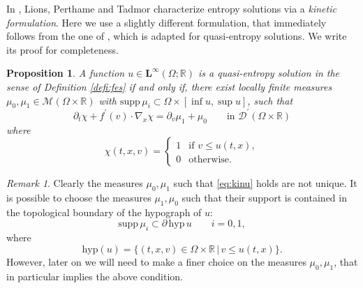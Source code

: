 \documentclass[11pt, twoside, reqno]{amsart}
\newtheorem{prop}[thm]{Proposition}
\theoremstyle{definition}
\theoremstyle{remark}
\newtheorem{remark}[thm]{Remark}
\numberwithin{equation}{section}
\newcommand{\R}{\mathbb R}
\newcommand{\mr}[1]{\mathrm{#1}}
\newcommand{\msc}[1]{\mathscr{#1}}
\begin{document}
 In \cite{LPT_kinetic}, Lions, Perthame and Tadmor characterize entropy solutions via a \textit{kinetic formulation}. 
Here we use a slightly different formulation, that immediately follows from the one of \cite{DOW03}, which is adapted for quasi-entropy solutions. We write its proof for completeness.
\begin{prop}\label{prop:feskin}
    A function $u \in \mathbf L^\infty(\Omega; \mathbb R)$ is a quasi-entropy solution in the sense of Definition \ref{defi:fes} if and only if, 
there exist locally finite measures $\mu_0, \mu_1 \in \msc M(\Omega \times \mathbb R)$ with $\mr{supp}\, \mu_i \subset \Omega \times [\inf u, \sup u]$, such that 
\begin{equation}\label{eq:kinu}
    \partial_t \chi + f^\prime(v) \cdot \nabla_x \chi = \partial_v \mu_1 + \mu_0 \qquad \text{in $\msc D^\prime(\Omega \times \mathbb R)$}
\end{equation}
where 
\begin{equation}\label{eq:chidef}
\chi(t, x, v) = \begin{cases}
    1 & \text{if $v \leq u(t,x)$},\\
    0 & \text{otherwise}.
\end{cases}
\end{equation}
\end{prop}
\begin{remark}
    Clearly the measures $\mu_0, \mu_1$ such that \eqref{eq:kinu} holds are not unique. It is possible to choose the measures $\mu_1, \mu_0$ such that their support is contained in the topological boundary of the hypograph of $u$:
    $$
    \mr{supp} \, \mu_i \subset \partial \, \mr{hyp} \, u \qquad i = 0,1,
    $$
    where
    $$
    \mr{hyp}(u)=\big\{(t,x,v)\in\Omega\times \R\,|\,
    v\leq u(t,x)\big\}.
    $$
    However, later on we will need to make a finer choice on the measures $\mu_0, \mu_1$, that in particular implies the above condition.
\end{remark}
\end{document}

